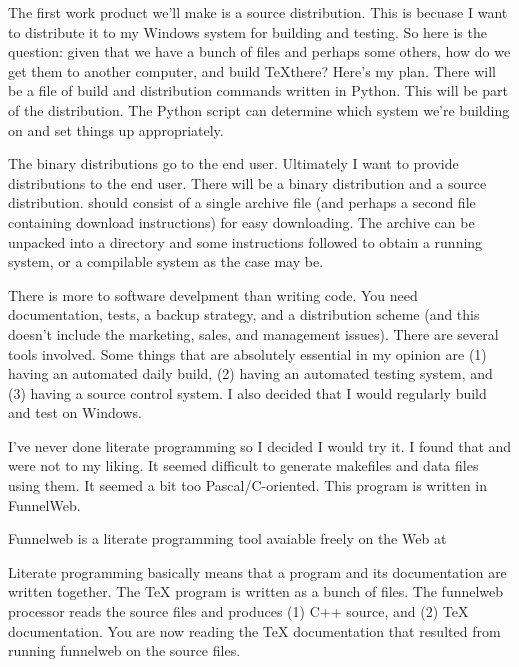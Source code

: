The first work product we'll make is a source distribution. This is
becuase I want to distribute it to my Windows system for building and
testing. So here is the question: given that we have a bunch of
 files and perhaps some others, how do we get them to another
computer, and build \TeX there? Here's my plan. There will be a file
of build and distribution commands written in Python. This will be
part of the distribution. The Python script can determine which system
we're building on and set things up appropriately.

The binary distributions go to the end user. Ultimately I want to
provide distributions to the end user. There will be a binary
distribution and a source distribution.  should consist of a single
archive file (and perhaps a second file containing download
instructions) for easy downloading. The archive can be unpacked into a
directory and some instructions followed to obtain a running system,
or a compilable system as the case may be.



There is more to software develpment than writing code. You need
documentation, tests, a backup strategy, and a distribution scheme
(and this doesn't include the marketing, sales, and management
issues). There are several tools involved. Some things that are
absolutely essential in my opinion are (1) having an automated daily
build, (2) having an automated testing system, and (3) having a source
control system. I also decided that I would regularly build and test
on Windows.


I've never done literate programming so I decided I would try it. I
found that  and  were not to my liking. It seemed
difficult to generate makefiles and data files using them. It seemed a
bit too Pascal/C-oriented. This program is written in FunnelWeb.


Funnelweb is a literate programming tool avaiable freely on the Web
at 

Literate programming basically means that a program and its
documentation are written together. The \TeX{} program is written as a
bunch of files. The funnelweb processor reads the source files and
produces (1) C++ source, and (2) \TeX{} documentation.  You are now
reading the \TeX{} documentation that resulted from running funnelweb on
the source files.


